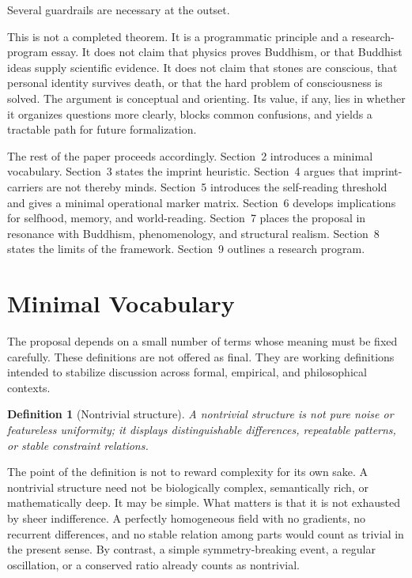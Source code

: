 \documentclass[12pt,a4paper]{article}
\newtheorem{definition}{Definition}[section]
\begin{document}
Several guardrails are necessary at the outset.

This is not a completed theorem. It is a programmatic principle and a research-program essay. It does not claim that physics proves Buddhism, or that Buddhist ideas supply scientific evidence. It does not claim that stones are conscious, that personal identity survives death, or that the hard problem of consciousness is solved. The argument is conceptual and orienting. Its value, if any, lies in whether it organizes questions more clearly, blocks common confusions, and yields a tractable path for future formalization.

The rest of the paper proceeds accordingly. Section~2 introduces a minimal vocabulary. Section~3 states the imprint heuristic. Section~4 argues that imprint-carriers are not thereby minds. Section~5 introduces the self-reading threshold and gives a minimal operational marker matrix. Section~6 develops implications for selfhood, memory, and world-reading. Section~7 places the proposal in resonance with Buddhism, phenomenology, and structural realism. Section~8 states the limits of the framework. Section~9 outlines a research program.

\section{Minimal Vocabulary}

The proposal depends on a small number of terms whose meaning must be fixed carefully. These definitions are not offered as final. They are working definitions intended to stabilize discussion across formal, empirical, and philosophical contexts.

\begin{definition}[Nontrivial structure]
A \emph{nontrivial structure} is not pure noise or featureless uniformity; it displays distinguishable differences, repeatable patterns, or stable constraint relations.
\end{definition}

The point of the definition is not to reward complexity for its own sake. A nontrivial structure need not be biologically complex, semantically rich, or mathematically deep. It may be simple. What matters is that it is not exhausted by sheer indifference. A perfectly homogeneous field with no gradients, no recurrent differences, and no stable relation among parts would count as trivial in the present sense. By contrast, a simple symmetry-breaking event, a regular oscillation, or a conserved ratio already counts as nontrivial.
\end{document}
